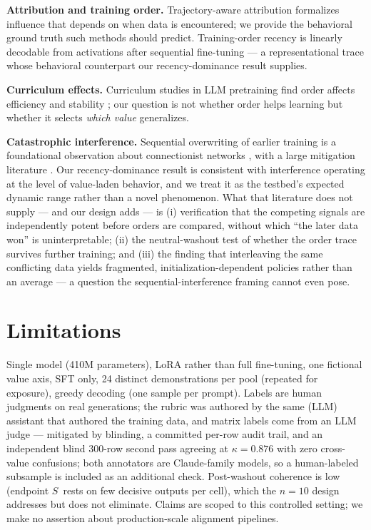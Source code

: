 \documentclass{article}
\newcommand{\score}{$S$\xspace}
\begin{document}
\textbf{Attribution and training order.} Trajectory-aware attribution
\citep{wang2024temporal} formalizes influence that depends on when data is
encountered; we provide the behavioral ground truth such methods should predict.
Training-order recency is linearly decodable from activations after sequential
fine-tuning \citep{krasheninnikov2025fresh} --- a representational trace whose
behavioral counterpart our recency-dominance result supplies.

\textbf{Curriculum effects.} Curriculum studies in LLM pretraining find order affects
efficiency and stability \citep{elgaar2026curriculum}; our question is not whether
order helps learning but whether it selects \emph{which value} generalizes.

\textbf{Catastrophic interference.} Sequential overwriting of earlier training is a
foundational observation about connectionist networks
\citep{mccloskey1989catastrophic, french1999catastrophic}, with a large mitigation
literature \citep{kirkpatrick2017overcoming}. Our recency-dominance result is
consistent with interference operating at the level of value-laden behavior, and we
treat it as the testbed's expected dynamic range rather than a novel phenomenon. What
that literature does not supply --- and our design adds --- is (i) verification that
the competing signals are independently potent before orders are compared, without
which ``the later data won'' is uninterpretable; (ii) the neutral-washout test of
whether the order trace survives further training; and (iii) the finding that
interleaving the same conflicting data yields fragmented, initialization-dependent
policies rather than an average --- a question the sequential-interference framing
cannot even pose.

\section{Limitations}

Single model (410M parameters), LoRA rather than full fine-tuning, one fictional value
axis, SFT only, 24 distinct demonstrations per pool (repeated for exposure), greedy
decoding (one sample per prompt). Labels are human judgments on real generations;
the rubric was authored by the same (LLM) assistant that authored the training data,
and matrix labels come from an LLM judge --- mitigated by blinding, a committed
per-row audit trail, and an independent blind 300-row second pass agreeing at
$\kappa{=}0.876$ with zero cross-value confusions; both annotators are Claude-family
models, so a human-labeled subsample is included as an additional check.
Post-washout coherence is low (endpoint \score\ rests on few decisive outputs per
cell), which the $n{=}10$ design addresses but does not eliminate. Claims are scoped
to this controlled setting; we make no assertion about production-scale alignment
pipelines.
\end{document}

